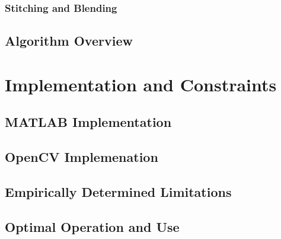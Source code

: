 \documentclass[11pt]{report}
\begin{document}
\begin{doublespace}
\subsection{Stitching and Blending}

\indent



\section{Algorithm Overview}

\indent




\chapter{Implementation and Constraints}

\indent



\section{MATLAB\textsuperscript{\textregistered} Implementation}

\indent



\section{OpenCV Implemenation}

\indent



\section{Empirically Determined Limitations}

\indent


\section{Optimal Operation and Use}


\end{doublespace}
\end{document}
